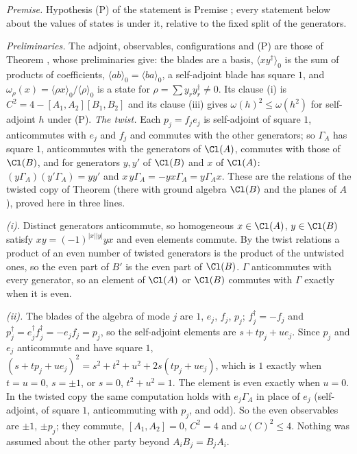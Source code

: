 \emph{Premise.} Hypothesis (P) of the statement is Premise ; every statement below about the values of states is under it, relative to the fixed split of the generators.

\emph{Preliminaries.} The adjoint, observables, configurations and (P) are those of Theorem , whose preliminaries give: the blades are a basis, $\langle xy^{\dagger}\rangle_{0}$ is the sum of products of coefficients, $\langle ab\rangle_{0} = \langle ba\rangle_{0}$, a self-adjoint blade has square $1$, and $\omega_{\rho}(x) = \langle\rho x\rangle_{0}/\langle\rho\rangle_{0}$ is a state for $\rho = \sum y_{r}y_{r}^{\dagger} \ne 0$. Its clause (i) is $C^{2} = 4 - [A_{1},A_{2}][B_{1},B_{2}]$ and its clause (iii) gives $\omega(h)^{2} \le \omega(h^{2})$ for self-adjoint $h$ under (P). \emph{The twist.} Each $p_{j} = f_{j}e_{j}$ is self-adjoint of square $1$, anticommutes with $e_{j}$ and $f_{j}$ and commutes with the other generators; so $\Gamma_{A}$ has square $1$, anticommutes with the generators of $\Cl(A)$, commutes with those of $\Cl(B)$, and for generators $y, y'$ of $\Cl(B)$ and $x$ of $\Cl(A)$: $(y\Gamma_{A})(y'\Gamma_{A}) = yy'$ and $x\,y\Gamma_{A} = -yx\Gamma_{A} = y\Gamma_{A}x$. These are the relations of the twisted copy of Theorem  (there with ground algebra $\Cl(B)$ and the planes of $A$), proved here in three lines.

\emph{(i).} Distinct generators anticommute, so homogeneous $x \in \Cl(A)$, $y \in \Cl(B)$ satisfy $xy = (-1)^{|x||y|}yx$ and even elements commute. By the twist relations a product of an even number of twisted generators is the product of the untwisted ones, so the even part of $B'$ is the even part of $\Cl(B)$. $\Gamma$ anticommutes with every generator, so an element of $\Cl(A)$ or $\Cl(B)$ commutes with $\Gamma$ exactly when it is even.

\emph{(ii).} The blades of the algebra of mode $j$ are $1$, $e_{j}$, $f_{j}$, $p_{j}$; $f_{j}^{\dagger} = -f_{j}$ and $p_{j}^{\dagger} = e_{j}^{\dagger}f_{j}^{\dagger} = -e_{j}f_{j} = p_{j}$, so the self-adjoint elements are $s + tp_{j} + ue_{j}$. Since $p_{j}$ and $e_{j}$ anticommute and have square $1$, $(s + tp_{j} + ue_{j})^{2} = s^{2} + t^{2} + u^{2} + 2s(tp_{j} + ue_{j})$, which is $1$ exactly when $t = u = 0$, $s = \pm 1$, or $s = 0$, $t^{2} + u^{2} = 1$. The element is even exactly when $u = 0$. In the twisted copy the same computation holds with $e_{j}\Gamma_{A}$ in place of $e_{j}$ (self-adjoint, of square $1$, anticommuting with $p_{j}$, and odd). So the even observables are $\pm 1$, $\pm p_{j}$; they commute, $[A_{1},A_{2}] = 0$, $C^{2} = 4$ and $\omega(C)^{2} \le 4$. Nothing was assumed about the other party beyond $A_{i}B_{j} = B_{j}A_{i}$.

